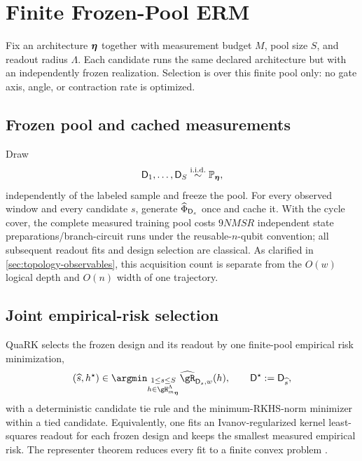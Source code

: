 \section{Finite Frozen-Pool ERM}
\label{sec:model-selection}

Fix an architecture $\bm{\eta}$ together with measurement budget $M$, pool size
$S$, and readout radius $\Lambda$.  Each candidate runs the same declared
architecture but with an independently frozen realization.  Selection is over
this finite pool only: no gate axis, angle, or contraction rate is optimized.

\subsection{Frozen pool and cached measurements}
\label{sec:frozen-pool-fitting}

Draw
\[
    \mathsf D_1,\ldots,\mathsf D_S
    \overset{\mathrm{i.i.d.}}{\sim}\mathbb P_{\bm{\eta}},
\]
independently of the labeled sample and freeze the pool.  For every observed
window and every candidate $s$, generate
$\widehat\Phi_{\mathsf D_s}$ once and cache it.  With the cycle cover,
the complete measured training pool costs $9NMSR$ independent state
preparations/branch-circuit runs under the reusable-$n$-qubit convention; all
subsequent readout fits and design selection are classical.  As clarified in
\cref{sec:topology-observables}, this acquisition count is separate from the
$O(w)$ logical depth and $O(n)$ width of one trajectory.

\subsection{Joint empirical-risk selection}
\label{sec:full-sample-erm}
\label{sec:structural-risk-selection}

QuaRK selects the frozen design and its readout by one finite-pool empirical
risk minimization,
\begin{equation}
    (\widehat s,\selectedReadout)
    \in\argmin_{\substack{1\leq s\leq S\\
                          h\in\RKHS_{m_{\arch}}^\Lambda}}
       \erisk_{\design_s,w}(h),
    \qquad
    \selectedDesign:=\design_{\widehat s},
    \label{eq:frozen-pool-erm}
\end{equation}
with a deterministic candidate tie rule and the minimum-RKHS-norm minimizer
within a tied candidate.  Equivalently, one fits an Ivanov-regularized kernel
least-squares readout for each frozen design and keeps the smallest measured
empirical risk.  The representer theorem reduces every fit to a finite convex
problem \citep{PageGrunewalder2019,scholkopf2001generalized}.

